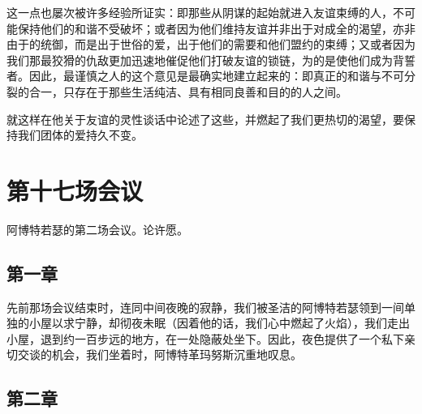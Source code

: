 这一点也屡次被许多经验所证实：即那些从阴谋的起始就进入友谊束缚的人，不可能保持他们的和谐不受破坏；或者因为他们维持友谊并非出于对成全的渴望，亦非由于的统御，而是出于世俗的爱，出于他们的需要和他们盟约的束缚；又或者因为我们那最狡猾的仇敌更加迅速地催促他们打破友谊的锁链，为的是使他们成为背誓者。因此，最谨慎之人的这个意见是最确实地建立起来的：即真正的和谐与不可分裂的合一，只存在于那些生活纯洁、具有相同良善和目的的人之间。\par

就这样在他关于友谊的灵性谈话中论述了这些，并燃起了我们更热切的渴望，要保持我们团体的爱持久不变。\par



\section{第十七场会议}

\par

阿博特若瑟的第二场会议。论许愿。\par


\subsection{第一章}

\par

先前那场会议结束时，连同中间夜晚的寂静，我们被圣洁的阿博特若瑟领到一间单独的小屋以求宁静，却彻夜未眠（因着他的话，我们心中燃起了火焰），我们走出小屋，退到约一百步远的地方，在一处隐蔽处坐下。因此，夜色提供了一个私下亲切交谈的机会，我们坐着时，阿博特革玛努斯沉重地叹息。\par


\subsection{第二章}

